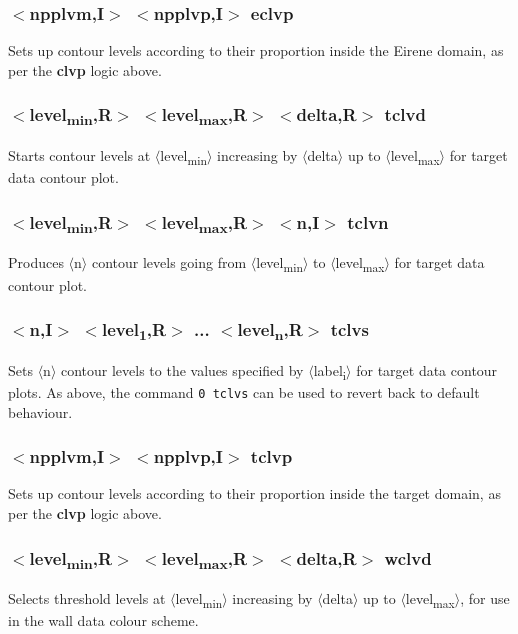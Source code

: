 \documentclass[a4paper,10pt]{report}
\begin{document}
\subsubsection{$<$npplvm,{\bf I}$>$ $<$npplvp,{\bf I}$>$ eclvp}\label{sec:eclvp}
Sets up contour levels according to their proportion inside the Eirene domain, as per the {\bf clvp} logic above.

\subsubsection{$<$level\textsubscript{min},{\bf R}$>$ $<$level\textsubscript{max},{\bf R}$>$ $<$delta,{\bf R}$>$ tclvd}\label{sec:tclvd}
Starts contour levels at $\langle$level\textsubscript{min}$\rangle$ increasing by $\langle$delta$\rangle$ up
to $\langle$level\textsubscript{max}$\rangle$ for target data contour plot.

\subsubsection{$<$level\textsubscript{min},{\bf R}$>$ $<$level\textsubscript{max},{\bf R}$>$ $<$n,{\bf I}$>$ tclvn}\label{sec:tclvn}
Produces $\langle$n$\rangle$ contour levels going from $\langle$level\textsubscript{min}$\rangle$ to $\langle$level\textsubscript{max}$\rangle$ for target data contour plot.

\subsubsection{$<$n,{\bf I}$>$ $<$level\textsubscript{1},{\bf R}$>$ ... $<$level\textsubscript{n},{\bf R}$>$ tclvs}\label{sec:tclvs}
Sets $\langle$n$\rangle$ contour levels to the values specified by $\langle$label\textsubscript{i}$\rangle$ for target data contour plots.
As above, the command {\tt 0 tclvs} can be used to revert back to default behaviour.

\subsubsection{$<$npplvm,{\bf I}$>$ $<$npplvp,{\bf I}$>$ tclvp}\label{sec:tclvp}
Sets up contour levels according to their proportion inside the target domain, as per the {\bf clvp} logic above.

\subsubsection{$<$level\textsubscript{min},{\bf R}$>$ $<$level\textsubscript{max},{\bf R}$>$ $<$delta,{\bf R}$>$ wclvd}\label{sec:wclvd}
Selects threshold levels at $\langle$level\textsubscript{min}$\rangle$ increasing by $\langle$delta$\rangle$ up
to $\langle$level\textsubscript{max}$\rangle$, for use in the wall data colour scheme.
\end{document}
